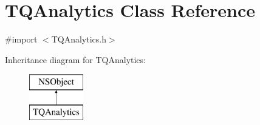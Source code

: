 \hypertarget{interface_t_q_analytics}{}\section{T\+Q\+Analytics Class Reference}
\label{interface_t_q_analytics}


{\ttfamily \#import $<$T\+Q\+Analytics.\+h$>$}

Inheritance diagram for T\+Q\+Analytics\+:\begin{figure}[H]
\begin{center}
\leavevmode
\includegraphics[height=2.000000cm]{interface_t_q_analytics}
\end{center}
\end{figure}
